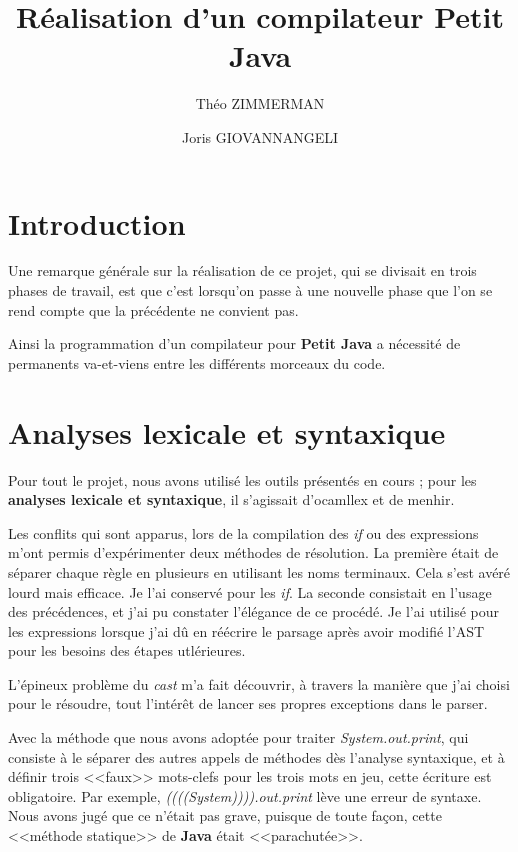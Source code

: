 \documentclass{article}
\title{Réalisation d'un compilateur Petit Java}
\author{Théo ZIMMERMAN \and Joris GIOVANNANGELI}
\begin{document}
\maketitle

\section*{Introduction}

Une remarque générale sur la réalisation de ce projet, qui se divisait en
trois phases de travail, est que c'est lorsqu'on passe à une nouvelle phase
que l'on se rend compte que la précédente ne convient pas.

Ainsi la programmation d'un compilateur pour \textbf{Petit Java} a
nécessité de permanents va-et-viens entre les différents morceaux du code.

\section{Analyses lexicale et syntaxique}

Pour tout le projet, nous avons utilisé les outils présentés en cours ;
pour les \textbf{analyses lexicale et syntaxique}, il s'agissait d'ocamllex
et de menhir.

Les conflits qui sont apparus, lors de la compilation des \emph{if} ou des
expressions m'ont permis d'expérimenter deux méthodes de résolution.
La première était de séparer chaque règle en plusieurs en utilisant les
noms terminaux. Cela s'est avéré lourd mais efficace. Je l'ai conservé pour
les \emph{if}. La seconde consistait en l'usage des précédences, et j'ai pu
constater l'élégance de ce procédé. Je l'ai utilisé pour les expressions
lorsque j'ai dû en réécrire le parsage après avoir modifié l'AST pour les
besoins des étapes utlérieures.

L'épineux problème du \emph{cast} m'a fait découvrir, à travers la manière
que j'ai choisi pour le résoudre, tout l'intérêt de lancer ses propres
exceptions dans le parser.

Avec la méthode que nous avons adoptée pour traiter
\emph{System.out.print}, qui consiste à le séparer des autres appels de
méthodes dès l'analyse syntaxique, et à définir trois <<faux>> mots-clefs
pour les trois mots en jeu, cette écriture est obligatoire. Par
exemple, \emph{((((System)))).out.print} lève une erreur de syntaxe.
Nous avons jugé que ce n'était pas grave, puisque de toute façon, cette
<<méthode statique>> de \textbf{Java} était <<parachutée>>.
\end{document}
